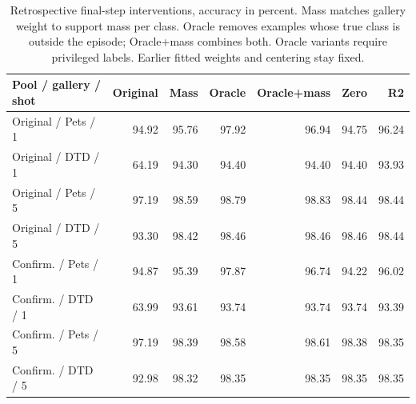 \begin{table}[t]
\centering\small\setlength{\tabcolsep}{3pt}
\begin{tabular}{lrrrrrr}
\toprule
Pool / gallery / shot & Original & Mass & Oracle & Oracle+mass & Zero & R2 \\ \midrule
Original / Pets / 1 & 94.92 & 95.76 & 97.92 & 96.94 & 94.75 & 96.24 \\
Original / DTD / 1 & 64.19 & 94.30 & 94.40 & 94.40 & 94.40 & 93.93 \\
Original / Pets / 5 & 97.19 & 98.59 & 98.79 & 98.83 & 98.44 & 98.44 \\
Original / DTD / 5 & 93.30 & 98.42 & 98.46 & 98.46 & 98.46 & 98.44 \\
Confirm. / Pets / 1 & 94.87 & 95.39 & 97.87 & 96.74 & 94.22 & 96.02 \\
Confirm. / DTD / 1 & 63.99 & 93.61 & 93.74 & 93.74 & 93.74 & 93.39 \\
Confirm. / Pets / 5 & 97.19 & 98.39 & 98.58 & 98.61 & 98.38 & 98.35 \\
Confirm. / DTD / 5 & 92.98 & 98.32 & 98.35 & 98.35 & 98.35 & 98.35 \\
\bottomrule\end{tabular}
\caption{Retrospective final-step interventions, accuracy in percent. Mass matches gallery weight to support mass per class. Oracle removes examples whose true class is outside the episode; Oracle+mass combines both. Oracle variants require privileged labels. Earlier fitted weights and centering stay fixed.}\label{tab:interventions}
\end{table}
